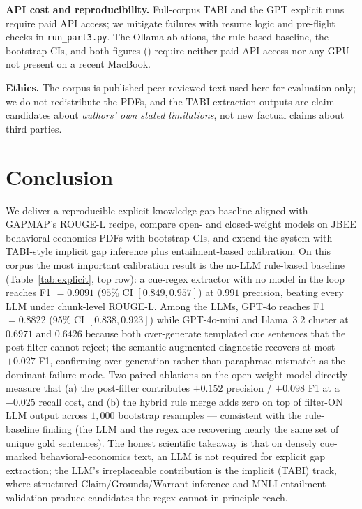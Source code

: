 \documentclass{article}
\begin{document}
\textbf{API cost and reproducibility.} Full-corpus TABI and the GPT explicit runs require paid API access; we mitigate failures with resume logic and pre-flight checks in \texttt{run\_part3.py}. The Ollama ablations, the rule-based baseline, the bootstrap CIs, and both figures () require neither paid API access nor any GPU not present on a recent MacBook.

\textbf{Ethics.} The corpus is published peer-reviewed text used here for evaluation only; we do not redistribute the PDFs, and the TABI extraction outputs are claim candidates about \emph{authors' own stated limitations}, not new factual claims about third parties.

\section{Conclusion}
\label{sec:concl}
We deliver a reproducible explicit knowledge-gap baseline aligned with GAPMAP's ROUGE-L recipe, compare open- and closed-weight models on JBEE behavioral economics PDFs with bootstrap CIs, and extend the system with TABI-style implicit gap inference plus entailment-based calibration. On this corpus the most important calibration result is the no-LLM rule-based baseline (Table~\ref{tab:explicit}, top row): a cue-regex extractor with no model in the loop reaches F1 $=0.9091$ ($95\%$ CI $[0.849, 0.957]$) at $0.991$ precision, beating every LLM under chunk-level ROUGE-L. Among the LLMs, GPT-4o reaches F1 $=0.8822$ ($95\%$ CI $[0.838, 0.923]$) while GPT-4o-mini and Llama~3.2 cluster at $0.6971$ and $0.6426$ because both over-generate templated cue sentences that the post-filter cannot reject; the semantic-augmented diagnostic recovers at most $+0.027$ F1, confirming over-generation rather than paraphrase mismatch as the dominant failure mode. Two paired ablations on the open-weight model directly measure that (a) the post-filter contributes $+0.152$ precision / $+0.098$ F1 at a $-0.025$ recall cost, and (b) the hybrid rule merge adds zero on top of filter-ON LLM output across $1{,}000$ bootstrap resamples --- consistent with the rule-baseline finding (the LLM and the regex are recovering nearly the same set of unique gold sentences). The honest scientific takeaway is that on densely cue-marked behavioral-economics text, an LLM is not required for explicit gap extraction; the LLM's irreplaceable contribution is the implicit (TABI) track, where structured Claim/Grounds/Warrant inference and MNLI entailment validation produce candidates the regex cannot in principle reach.
\end{document}
